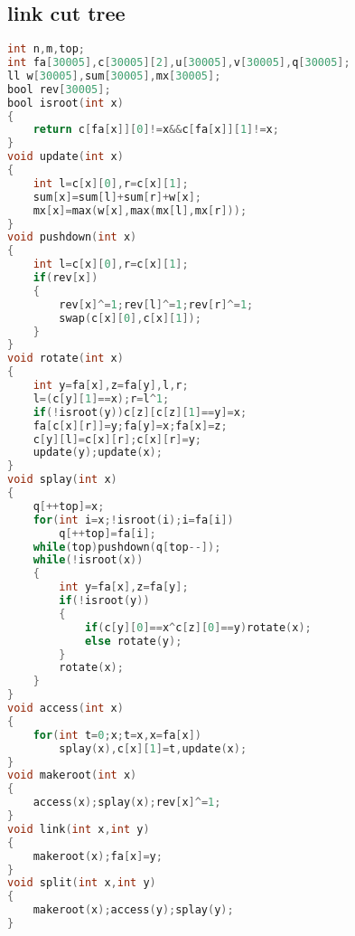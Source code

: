 \subsection{link cut tree}
\begin{lstlisting}[language=C]
int n,m,top;
int fa[30005],c[30005][2],u[30005],v[30005],q[30005];
ll w[30005],sum[30005],mx[30005];
bool rev[30005];
bool isroot(int x)
{
	return c[fa[x]][0]!=x&&c[fa[x]][1]!=x;
}
void update(int x)
{
	int l=c[x][0],r=c[x][1];
	sum[x]=sum[l]+sum[r]+w[x];
	mx[x]=max(w[x],max(mx[l],mx[r]));
}
void pushdown(int x)
{
	int l=c[x][0],r=c[x][1];
	if(rev[x])
	{
		rev[x]^=1;rev[l]^=1;rev[r]^=1;
		swap(c[x][0],c[x][1]);
	}
}
void rotate(int x)
{
	int y=fa[x],z=fa[y],l,r;
	l=(c[y][1]==x);r=l^1;
	if(!isroot(y))c[z][c[z][1]==y]=x;
	fa[c[x][r]]=y;fa[y]=x;fa[x]=z;
	c[y][l]=c[x][r];c[x][r]=y;
	update(y);update(x);
}
void splay(int x)
{
	q[++top]=x;
	for(int i=x;!isroot(i);i=fa[i])
		q[++top]=fa[i];
	while(top)pushdown(q[top--]);
	while(!isroot(x))
	{
		int y=fa[x],z=fa[y];
		if(!isroot(y))
		{
			if(c[y][0]==x^c[z][0]==y)rotate(x);
			else rotate(y);
		}
		rotate(x);
	}
}
void access(int x)
{
	for(int t=0;x;t=x,x=fa[x])
		splay(x),c[x][1]=t,update(x);
}
void makeroot(int x)
{
	access(x);splay(x);rev[x]^=1;
}
void link(int x,int y)
{
	makeroot(x);fa[x]=y;
}
void split(int x,int y)
{
	makeroot(x);access(y);splay(y);
}
\end{lstlisting} 
